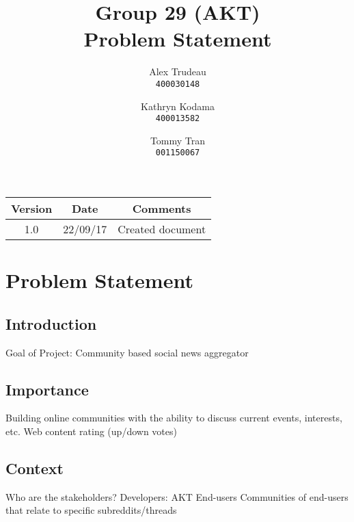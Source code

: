 \documentclass[12pt,fleqn]{article}
\title{Group 29 (AKT)\\ Problem Statement}
\author{
Alex Trudeau\\
	\texttt{400030148}
\and
Kathryn Kodama\\
  	\texttt{400013582}
\and
Tommy Tran\\
	\texttt{001150067}
}
\begin{document}
\maketitle

\begin{center}

\begin{tabular}{ |c| c| c| }
\hline
Version & Date & Comments \\
\hline
1.0 & 22/09/17 & Created document \\
\hline
\end{tabular}
\end{center}


\pagebreak
\section* {Problem Statement}

\subsection{Introduction}
Goal of Project:
Community based social news aggregator 

\subsection{Importance}

Building online communities with the ability to discuss current events, interests, etc.
Web content rating (up/down votes)


\subsection{Context}

Who are the stakeholders?
Developers: AKT
End-users
Communities of end-users that relate to specific subreddits/threads
\end{document}

